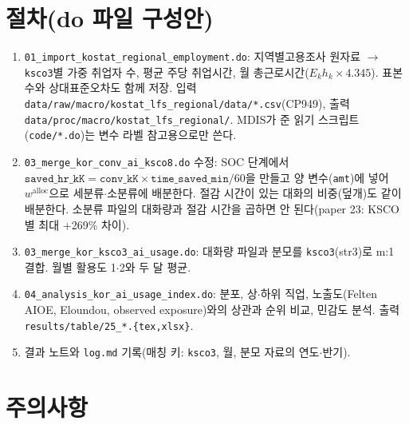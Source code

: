 \documentclass[11pt]{article}
\begin{document}
\section{절차(do 파일 구성안)}

\begin{enumerate}[leftmargin=*]
  \item \texttt{01\_import\_kostat\_regional\_employment.do}: 지역별고용조사 원자료 $\to$ \texttt{ksco3}별 가중 취업자 수, 평균 주당 취업시간, 월 총근로시간($E_k h_k \times 4.345$). 표본 수와 상대표준오차도 함께 저장. 입력 \texttt{data/raw/macro/kostat\_lfs\_regional/data/*.csv}(CP949), 출력 \texttt{data/proc/macro/kostat\_lfs\_regional/}. MDIS가 준 읽기 스크립트(\texttt{code/*.do})는 변수 라벨 참고용으로만 쓴다.
  \item \texttt{03\_merge\_kor\_conv\_ai\_ksco8.do} 수정: SOC 단계에서 $\texttt{saved\_hr\_kK} = \texttt{conv\_kK} \times \texttt{time\_saved\_min}/60$을 만들고 양 변수(\texttt{amt})에 넣어 $w^{\text{alloc}}$으로 세분류$\cdot$소분류에 배분한다. 절감 시간이 있는 대화의 비중(덮개)도 같이 배분한다. 소분류 파일의 대화량과 절감 시간을 곱하면 안 된다(paper 23: KSCO별 최대 +269\% 차이).
  \item \texttt{03\_merge\_kor\_ksco3\_ai\_usage.do}: 대화량 파일과 분모를 \texttt{ksco3}(str3)로 m:1 결합. 월별 활용도 1$\cdot$2와 두 달 평균.
  \item \texttt{04\_analysis\_kor\_ai\_usage\_index.do}: 분포, 상$\cdot$하위 직업, 노출도(Felten AIOE, Eloundou, observed exposure)와의 상관과 순위 비교, 민감도 분석. 출력 \texttt{results/table/25\_*.\{tex,xlsx\}}.
  \item 결과 노트와 \texttt{log.md} 기록(매칭 키: \texttt{ksco3}, 월, 분모 자료의 연도$\cdot$반기).
\end{enumerate}

\section{주의사항}\label{sec:caution}
\end{document}
